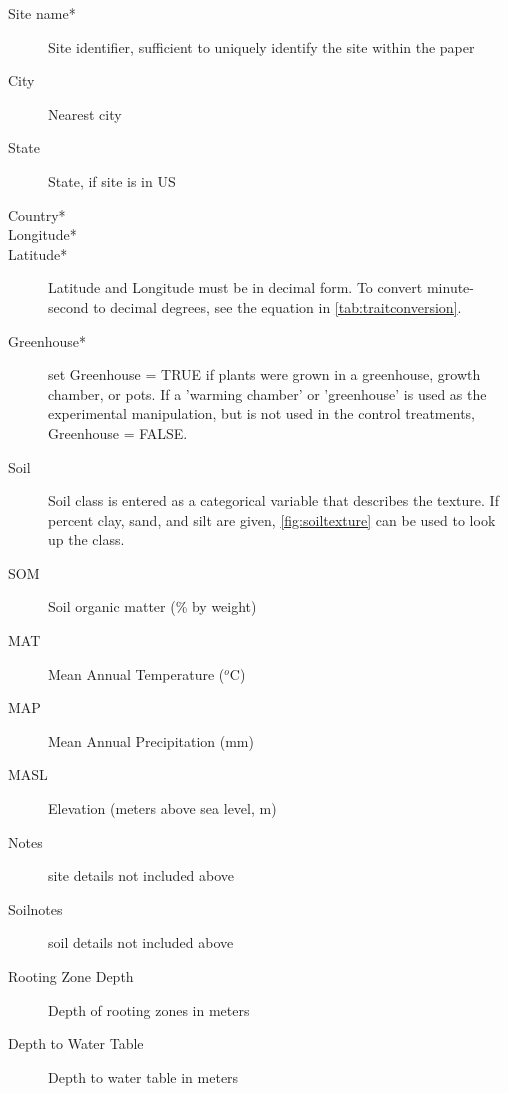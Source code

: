 \documentclass[12pt,english,portrait]{article}
\begin{document}



\begin{description}
\item[Site name*] Site identifier, sufficient to uniquely identify the site within the paper
\item[City] Nearest city
\item[State] State, if site is in US
\item[Country*]
\item[Longitude*]
\item[Latitude*] Latitude and Longitude must be in decimal form. To convert minute-second to decimal degrees, see the equation in \autoref{tab:traitconversion}. 
\item[Greenhouse*] set Greenhouse = TRUE if plants were grown in a greenhouse, growth chamber, or pots. If a 'warming chamber' or 'greenhouse' is used as the experimental manipulation, but is not used in the control treatments, Greenhouse = FALSE.
\item[Soil] Soil class is entered as a categorical variable that describes the texture. If percent clay, sand, and silt are given, \autoref{fig:soiltexture} can be used to look up the class.
\item[SOM] Soil organic matter (\% by weight)  
\item[MAT]  Mean Annual Temperature ($^o$C)
\item[MAP]  Mean Annual Precipitation (mm)
\item[MASL]    Elevation (meters above sea level, m)   
\item[Notes] site details not included above
\item[Soilnotes] soil details not included above  
\item[Rooting Zone Depth] Depth of rooting zones in meters      
\item[Depth to Water Table]  Depth to water table in meters
\end{description}
\end{document}

